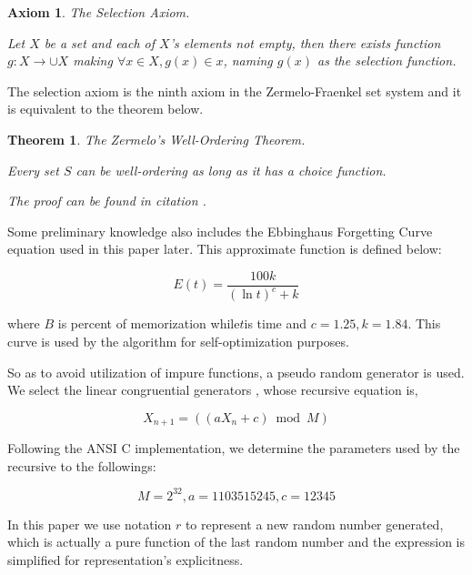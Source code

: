 \documentclass{aims}
\numberwithin{equation}{section}
\newtheorem{theorem}{Theorem}	%
\newtheorem{axiom}{Axiom}	%
\numberwithin{theorem}{section}	%
\numberwithin{axiom}{section}	%
\numberwithin{definition}{section}	%
\begin{document}
	\begin{axiom}
		The Selection Axiom.
		
		Let \(X\) be a set and each of \(X\){'}s elements not empty, then there exists function \(g:X\to \cup X\) making \(\forall x\in X,g(x)\in x\), naming \(g(x)\) as the selection function.
	\end{axiom}
	
	The selection axiom is the ninth axiom in the Zermelo-Fraenkel set system and it is equivalent to the theorem below.
	
	\begin{theorem}
		The Zermelo{'}s Well-Ordering Theorem.\cite{Li2019}
		
		Every set \(S\) can be well-ordering as long as it has a choice function.
		
		The proof can be found in citation \cite{Li2019}.
	\end{theorem}
	
	Some preliminary knowledge also includes the Ebbinghaus Forgetting Curve equation \cite{Ebbinghaus1913} used in this paper later. This approximate function is defined below:
	
	\begin{equation*}
		E(\mathit{t})=\frac{100 k}{(\ln  t)^c+k}
	\end{equation*}
	
	\noindent where \(B\) is percent of memorization while\(t\)is time and \(c=1.25,k=1.84\). This curve is used by the algorithm for self-optimization purposes.
	
	So as to avoid utilization of impure functions, a pseudo random generator is used. We select the linear congruential generators \cite{Entacher1997}, whose recursive equation is,
	
	\begin{equation*}
		X_{n+1}=(\left(a X_n+c\right) \bmod M)
	\end{equation*}
	
	Following the ANSI C implementation, we determine the parameters used by the recursive to the followings:
	
	\begin{equation*}
		M=2^{32},a=1103515245, c=12345
	\end{equation*}
	
	In this paper we use notation \(\mathit{r}\) to represent a new random number generated, which is actually a pure function of the last random number and the expression is simplified for representation{'}s explicitness.
	
\end{document}
